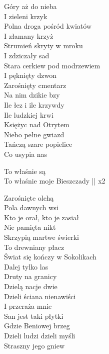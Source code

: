 \begin{text}
    Góry aż do nieba\\
    I zieleni krzyk\\
    Polna droga pośród kwiatów\\
    I złamany krzyż\\
    Strumień skryty w mroku\\
    I zdziczały sad\\
    Stara cerkiew pod modrzewiem\\
    I pęknięty dzwon\\
    Zarośnięty cmentarz\\
    Na nim dzikie bzy\\
    Ile łez i ile krzywdy\\
    Ile ludzkiej krwi\\
    Księżyc nad Otrytem\\
    Niebo pełne gwiazd\\
    Tańczą szare popielice\\
    Co usypia nas

    \vin To właśnie są\\
    \vin To właśnie moje Bieszczady || x2

    Zarośnięte olchą\\
    Pola dawnych wsi\\
    Kto je orał, kto je zasiał\\
    Nie pamięta nikt\\
    Skrzypią martwe świerki\\
    To drewniany płacz\\
    Świat się kończy w Sokolikach\\
    Dalej tylko las\\
    Druty na granicy\\
    Dzielą nacje dwie\\
    Dzieli ściana nienawiści\\
    I przeraża mnie\\
    San jest taki płytki\\
    Gdzie Beniowej brzeg\\
    Dzieli ludzi dzieli myśli\\
    Straszny jego gniew    
\end{text}
